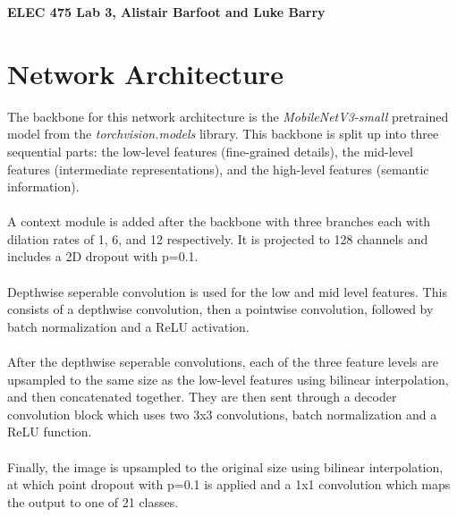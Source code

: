 \documentclass[letterpaper,11pt]{article}
\begin{document}
\begin{center}
  \LARGE
  \textbf{ELEC 475 Lab 3, Alistair Barfoot and Luke Barry}\\[12pt]
  \normalsize
\end{center}
\tableofcontents

\newpage

\section{Network Architecture}

The backbone for this network architecture is the \textit{MobileNetV3-small} pretrained model from the \textit{torchvision.models} library. This backbone is split up into three sequential parts: the low-level features (fine-grained details), the mid-level features (intermediate representations), and the high-level features (semantic information). \\
\\
A context module is added after the backbone with three branches each with dilation rates of 1, 6, and 12 respectively. It is projected to 128 channels and includes a 2D dropout with p=0.1.\\
\\
Depthwise seperable convolution is used for the low and mid level features. This consists of a depthwise convolution, then a pointwise convolution, followed by batch normalization and a ReLU activation. \\
\\
After the depthwise seperable convolutions, each of the three feature levels are upsampled to the same size as the low-level features using bilinear interpolation, and then concatenated together. They are then sent through a decoder convolution block which uses two 3x3 convolutions, batch normalization and a ReLU function. \\
\\
Finally, the image is upsampled to the original size using bilinear interpolation, at which point dropout with p=0.1 is applied and a 1x1 convolution which maps the output to one of 21 classes.
\end{document}
